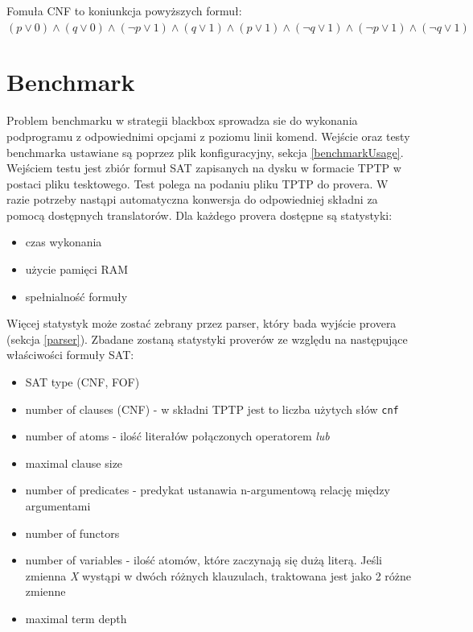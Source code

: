 \documentclass[a4paper,12pt]{article}
\begin{document}
\noindent
Fomuła \gls{CNF} to koniunkcja powyższych formuł: $
(p \lor 0) \land (q \lor 0) \land
(\lnot p \lor 1) \land (q \lor 1) \land
(p \lor 1) \land (\lnot q \lor 1) \land
(\lnot p \lor 1) \land (\lnot q \lor 1)
$

\section{Benchmark}

Problem benchmarku w strategii blackbox sprowadza sie do wykonania podprogramu z odpowiednimi opcjami z poziomu linii komend.
Wejście oraz testy benchmarka ustawiane są poprzez plik konfiguracyjny, sekcja \ref{benchmarkUsage}.  Wejściem testu jest zbiór formuł \gls{SAT} zapisanych na dysku w formacie TPTP w postaci pliku tesktowego. Test polega na podaniu pliku TPTP do provera. W razie potrzeby nastąpi automatyczna konwersja do odpowiedniej składni za pomocą dostępnych translatorów.
Dla każdego provera dostępne są statystyki:

\begin{itemize}
  \item czas wykonania
  \item użycie pamięci RAM
  \item spełnialność formuły
\end{itemize}

\noindent
Więcej statystyk może zostać zebrany przez parser, który bada wyjście provera (sekcja \ref{parser}).
\newline
Zbadane zostaną statystyki proverów ze względu na następujące właściwości formuły SAT:

\begin{itemize}
  \item SAT type (CNF, FOF)
  \item number of clauses (CNF) - w składni TPTP jest to liczba użytych słów \texttt{cnf}
  \item number of atoms - ilość literałów połączonych operatorem \textit{lub}
  \item maximal clause size
  \item number of predicates - predykat ustanawia n-argumentową relację między argumentami
  \item number of functors
  \item number of variables - ilość atomów, które zaczynają się dużą literą. Jeśli zmienna \textit{X} wystąpi w dwóch różnych klauzulach, traktowana jest jako 2 różne zmienne
  \item maximal term depth
\end{itemize}
\end{document}
